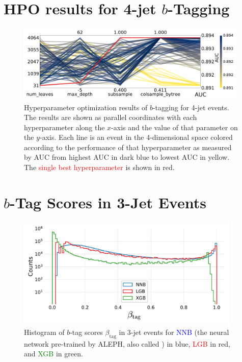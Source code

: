 \section[HPO results for 4-jet b-Tagging]{HPO results for 4-jet $b$-Tagging}
\begin{figure}
  \includegraphics[width=0.98\textwidth, trim=0 0 0 0, clip]{figures/quarks/CV_viz-njet=4-name=lf_lgb_down_sample=1.00-ML_vars=vertex-selection=b-ejet_min=4-n_iter_RS_lgb=99-n_iter_RS_xgb=9-cdot_cut=0.90-version=19.pdf}
  \caption[Parallel Coordinate Plot of HPO results for 4-Jet $b$-Tagging]
          {Hyperparameter optimization results of $b$-tagging for 4-jet events. The results are shown as parallel coordinates with each hyperparameter along the $x$-axis and the value of that parameter on the $y$-axis. Each line is an event in the 4-dimensional space colored according to the performance of that hyperparameter as measured by AUC from \textcolor{viridis-dark}{highest} AUC in dark blue to \textcolor{viridis-light}{lowest} AUC in yellow. The \textcolor{red}{single best hyperparameter} is shown in red. 
          } 
\end{figure}
\clearpage

\FloatBarrier
\section[b-Tag Scores in 3-Jet Events]{$b$-Tag Scores in 3-Jet Events}
\begin{figure}
  \includegraphics[width=0.95\textwidth, trim=0 0 0 30, clip]{figures/quarks/y_pred_3_jet_hist-down_sample=1.00-ML_vars=vertex-selection=b-ejet_min=4-n_iter_RS_lgb=99-n_iter_RS_xgb=9-cdot_cut=0.90-version=19.pdf}
  \caption[$b$-Tag Scores in 3-Jet Events]
          {Histogram of $b$-tag scores $\beta_\mathrm{tag}$ in 3-jet events for \textcolor{blue}{NNB} (the neural network pre-trained by ALEPH, also called ) in blue, \textcolor{red}{LGB} in red, and \textcolor{green}{XGB} in green. 
          } 
  \label{fig:q:btag_scores_3j}
\end{figure}

